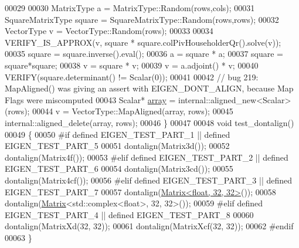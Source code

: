 \begin{DoxyCode}
00029 
00030   MatrixType a = MatrixType::Random(rows,cols);
00031   SquareMatrixType square = SquareMatrixType::Random(rows,rows);
00032   VectorType v = VectorType::Random(rows);
00033 
00034   VERIFY\_IS\_APPROX(v, square * square.colPivHouseholderQr().solve(v));
00035   square = square.inverse().eval();
00036   a = square * a;
00037   square = square*square;
00038   v = square * v;
00039   v = a.adjoint() * v;
00040   VERIFY(square.determinant() != Scalar(0));
00041 
00042   \textcolor{comment}{// bug 219: MapAligned() was giving an assert with EIGEN\_DONT\_ALIGN, because Map Flags were miscomputed}
00043   Scalar* \hyperlink{class_eigen_1_1array}{array} = internal::aligned\_new<Scalar>(rows);
00044   v = VectorType::MapAligned(array, rows);
00045   internal::aligned\_delete(array, rows);
00046 \}
00047 
00048 \textcolor{keywordtype}{void} test\_dontalign()
00049 \{
00050 \textcolor{preprocessor}{#if defined EIGEN\_TEST\_PART\_1 || defined EIGEN\_TEST\_PART\_5}
00051   dontalign(Matrix3d());
00052   dontalign(Matrix4f());
00053 \textcolor{preprocessor}{#elif defined EIGEN\_TEST\_PART\_2 || defined EIGEN\_TEST\_PART\_6}
00054   dontalign(Matrix3cd());
00055   dontalign(Matrix4cf());
00056 \textcolor{preprocessor}{#elif defined EIGEN\_TEST\_PART\_3 || defined EIGEN\_TEST\_PART\_7}
00057   dontalign(\hyperlink{group___core___module_class_eigen_1_1_matrix}{Matrix<float, 32, 32>}());
00058   dontalign(\hyperlink{group___core___module_class_eigen_1_1_matrix}{Matrix}<std::complex<float>, 32, 32>());
00059 \textcolor{preprocessor}{#elif defined EIGEN\_TEST\_PART\_4 || defined EIGEN\_TEST\_PART\_8}
00060   dontalign(MatrixXd(32, 32));
00061   dontalign(MatrixXcf(32, 32));
00062 \textcolor{preprocessor}{#endif}
00063 \}
\end{DoxyCode}
